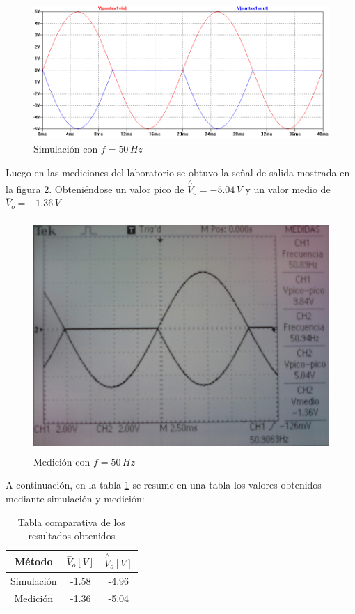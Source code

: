 \documentclass[10pt,spanish,a4paper,openany,notitlepage]{article}
\begin{document}
\begin{figure}[H]
\centering
\includegraphics[scale=0.65]{simulaciones/F4_vo_50.png}
\caption{Simulación con $f=50\,\unit{Hz}$}
\label{fig:F4_50_sim}
\end{figure}

Luego en las mediciones del laboratorio se obtuvo la señal de salida mostrada
en la figura \ref{fig:F4_50_med}. Obteniéndose un valor pico de 
$\overset{\wedge}{V}_{o} = -5.04\,\unit{V}$ y un valor medio de $\overset{-}{V}_{o} = -1.36\,\unit{V}$

\begin{figure}[H]
\centering
\includegraphics[width=350pt, height=250pt]{mediciones/F4-50Hz.jpg}
\caption{Medición con $f=50\,\unit{Hz}$}
\label{fig:F4_50_med}
\end{figure}


A continuación, en la tabla \ref{table:F_40} se resume en una tabla los
valores obtenidos mediante simulación y medición:

\begin{table}[H]
\centering
\begin{tabular}{|c|c|c|}
\hline
Método     & $\overset{-}{V}_{o} [\unit{V}] $  & $\overset{\wedge}{V}_{o} [\unit{V}]$ \\ \hline
Simulación & -1.58                 & -4.96  \\ \hline
Medición   & -1.36                    & -5.04                   \\ \hline
\end{tabular}
\caption{Tabla comparativa de los resultados obtenidos}
\label{table:F_40}
\end{table}
\end{document}
